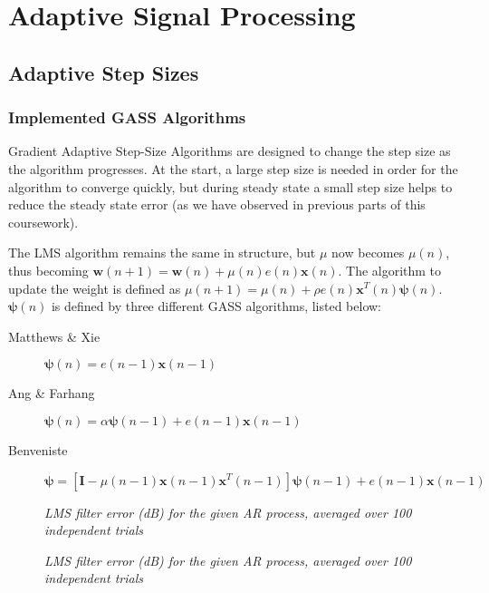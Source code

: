 \documentclass[./main.tex]{subfiles}
\begin{document}
\section{Adaptive Signal Processing}

\subsection{Adaptive Step Sizes}

\subsubsection{Implemented GASS Algorithms}
Gradient Adaptive Step-Size Algorithms are designed to change the step size as the algorithm progresses. At the start, a large step size is needed in order for the algorithm to converge quickly, but during steady state a small step size helps to reduce the steady state error (as we have observed in previous parts of this coursework).

The LMS algorithm remains the same in structure, but $\mu$ now becomes $\mu(n)$, thus becoming $  \mathbf{w}(n+1) = \mathbf{w}(n) + \mu(n) e(n) \mathbf{x}(n) $. The algorithm to update the weight is defined as $ \mu(n+1) = \mu(n) + \rho e(n) \mathbf{x}^T(n) \boldsymbol{\psi}(n)$. $ \boldsymbol{\psi}(n) $ is defined by three different GASS algorithms, listed below:

\begin{description}
	\item[Matthews \& Xie] $  \boldsymbol{\psi}(n) = e(n-1) \mathbf{x}(n-1) $
	\item[Ang \& Farhang] $  \boldsymbol{\psi}(n) = \alpha  \boldsymbol{\psi}(n - 1) +  e(n-1) \mathbf{x}(n-1) $
	\item[Benveniste] $ \boldsymbol{\psi} = [ \mathbf{I} - \mu(n-1) \mathbf{x}(n-1) \mathbf{x}^T(n-1)  ] \boldsymbol{\psi}(n - 1) + e(n-1) \mathbf{x}(n-1) $
\end{description}

\begin{figure}[h]
	\centering 
	\resizebox{\textwidth}{!}{}
	\caption{\textit{LMS filter error (dB) for the given AR process, averaged over 100 independent trials}}
	\label{fig:3_2_a_alpha}
\end{figure}

\begin{figure}[h]
	\centering 
	\resizebox{\textwidth}{!}{}
	\caption{\textit{LMS filter error (dB) for the given AR process, averaged over 100 independent trials}}
	\label{fig:3_2_a}
\end{figure}
\end{document}
